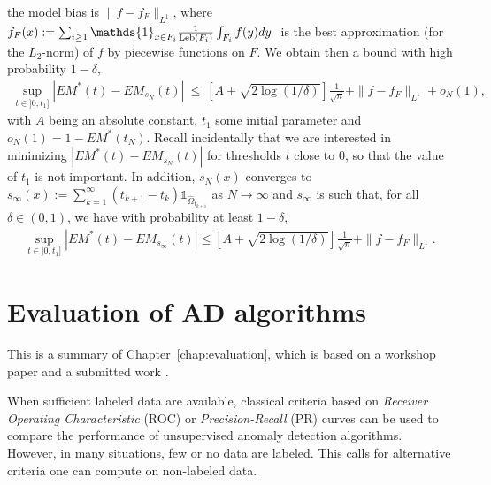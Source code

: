 the model bias is $\|f-f_{F}\|_{L^1}$, where $f_{F}(x) := \sum_{i \ge 1} \mathds{1}_{x \in F_i} \frac{1}{\leb(F_i)} \int_{F_i}f(y)dy~$ is the best approximation (for the $L_2$-norm) of $f$ by piecewise functions on $F$.
We obtain then a bound with high probability $1-\delta$,
\begin{align*}
\sup_{t \in ]0,t_1]}|EM^*(t)-EM_{s_N}(t)| ~\le~ \left[A+\sqrt{2\log(1/\delta)}\right]\frac{1}{\sqrt n} + \|f-f_{F}\|_{L^1}  + o_N(1), 
\end{align*}
with $A$ being an absolute constant, $t_1$ some initial parameter and $o_N(1)=1-EM^*(t_N)$. 
Recall incidentally that we are interested in minimizing $|EM^*(t)-EM_{s_N}(t)|$ for thresholds $t$ close to $0$, so that the value of $t_1$ is not important.
In addition, $s_N(x)$ converges to $s_\infty(x):=\sum_{k=1}^{\infty} (t_{k+1}-t_k)\mathds{1}_{\hat \Omega_{t_{k+1}}}$ as $N \rightarrow \infty$ and $s_\infty$ is such that, for all $\delta \in (0,1)$, we have with probability at least $1-\delta$,
\begin{align*}
\sup_{t \in ]0,t_1]}|EM^*(t)-EM_{s_\infty}(t)| \le \left[A+\sqrt{2\log(1/\delta)}\right]\frac{1}{\sqrt n} + \|f-f_{F}\|_{L^1}.
\end{align*}





\section{Evaluation of AD algorithms}
This is a summary of Chapter~\ref{chap:evaluation}, which is based on a workshop paper \citep{ICMLworkshop16} and a submitted work \citep{NIPS16evaluation}.


When sufficient labeled data are available, classical criteria based on \emph{Receiver Operating Characteristic} (ROC) or \emph{Precision-Recall} (PR) curves can be used to compare the performance of unsupervised anomaly detection algorithms. However, in many situations, few or no data are labeled. This calls for alternative criteria one can compute on non-labeled data.

